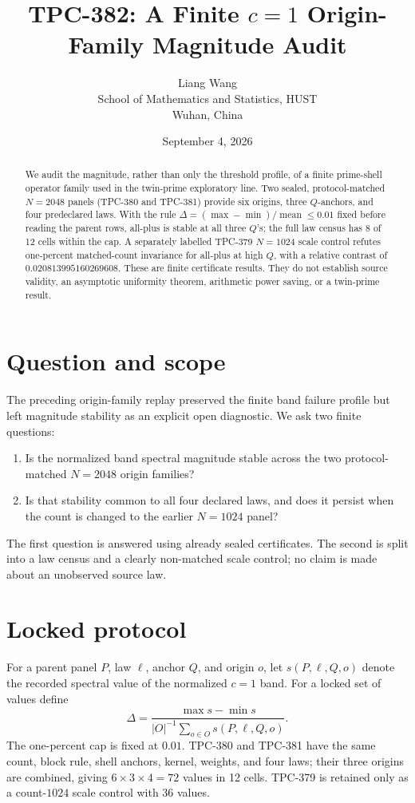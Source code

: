 \documentclass[10pt]{article}
\title{TPC-382: A Finite \(c=1\) Origin-Family Magnitude Audit}
\author{Liang Wang\\School of Mathematics and Statistics, HUST\\Wuhan, China}
\date{September 4, 2026}
\begin{document}
\maketitle

\begin{abstract}
We audit the magnitude, rather than only the threshold profile, of a finite
prime-shell operator family used in the twin-prime exploratory line.  Two
sealed, protocol-matched \(N=2048\) panels (TPC-380 and TPC-381) provide six
origins, three \(Q\)-anchors, and four predeclared laws.  With the rule
\(\Delta=(\max-\min)/\operatorname{mean}\leq 0.01\) fixed before reading the
parent rows, all-plus is stable at all three \(Q\)'s; the full law census has
8 of 12 cells within the cap.  A separately labelled TPC-379 \(N=1024\)
scale control refutes one-percent matched-count invariance for all-plus at
high \(Q\), with a relative contrast of \(0.020813995160269608\).  These are
finite certificate results.  They do not establish source validity, an
asymptotic uniformity theorem, arithmetic power saving, or a twin-prime result.
\end{abstract}

\section{Question and scope}

The preceding origin-family replay preserved the finite band failure profile
but left magnitude stability as an explicit open diagnostic.  We ask two
finite questions:
\begin{enumerate}
\item Is the normalized band spectral magnitude stable across the two
protocol-matched \(N=2048\) origin families?
\item Is that stability common to all four declared laws, and does it persist
when the count is changed to the earlier \(N=1024\) panel?
\end{enumerate}
The first question is answered using already sealed certificates.  The second
is split into a law census and a clearly non-matched scale control; no claim is
made about an unobserved source law.

\section{Locked protocol}

For a parent panel \(P\), law \(\ell\), anchor \(Q\), and origin \(o\), let
\(s(P,\ell,Q,o)\) denote the recorded spectral value of the normalized
\(c=1\) band.  For a locked set of values define
\[
 \Delta=\frac{\max s-\min s}{|O|^{-1}\sum_{o\in O}s(P,\ell,Q,o)}.
\]
The one-percent cap is fixed at \(0.01\).  TPC-380 and TPC-381 have the same
count, block rule, shell anchors, kernel, weights, and four laws; their three
origins are combined, giving \(6\times3\times4=72\) values in 12 cells.
TPC-379 is retained only as a count-\(1024\) scale control with 36 values.
\end{document}
